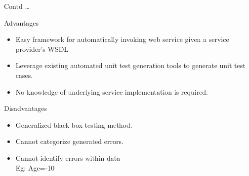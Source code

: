 \documentclass[10pt]{beamer}
\begin{document}
%
\begin{frame}{Contd \dots}

  \begin{block}{Advantages}
    \begin{itemize}
    \item Easy framework for automatically invoking web service given a service provider's WSDL
    \item Leverage existing automated unit test generation tools to generate unit test cases.
    \item No knowledge of underlying service implementation is required.
    \end{itemize}
  \end{block}
  \begin{block}{Disadvantages}
    \begin{itemize}
    \item Generalized black box testing method. 
    \item Cannot categorize generated errors.
    \item Cannot identify errors within data\\
    Eg: Age=-10
    \end{itemize}
  \end{block}
\end{frame}
\end{document}
